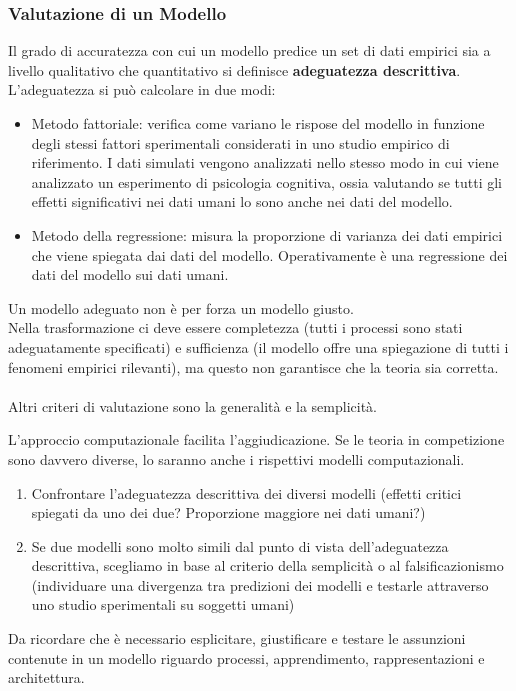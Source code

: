 \documentclass[12pt, a4paper]{article}
\begin{document}
\subsubsection{Valutazione di un Modello}
Il grado di accuratezza con cui un modello predice un set di dati empirici sia a livello qualitativo che quantitativo si definisce \textbf{adeguatezza descrittiva}.
L'adeguatezza si può calcolare in due modi:
\begin{itemize}
    \item Metodo fattoriale: verifica come variano le rispose del modello in funzione degli stessi fattori sperimentali considerati in uno studio empirico di riferimento. I dati simulati vengono analizzati nello stesso modo in cui viene analizzato un esperimento di psicologia cognitiva, ossia valutando se tutti gli effetti significativi nei dati umani lo sono anche nei dati del modello.
    \item Metodo della regressione: misura la proporzione di varianza dei dati empirici che viene spiegata dai dati del modello. Operativamente è una regressione dei dati del modello sui dati umani.
\end{itemize}
Un modello adeguato non è per forza un modello giusto.\\
Nella trasformazione ci deve essere completezza (tutti i processi sono stati adeguatamente specificati) e sufficienza (il modello offre una spiegazione di tutti i fenomeni empirici rilevanti), ma questo non garantisce che la teoria sia corretta.\\\\
Altri criteri di valutazione sono la generalità e la semplicità.

L'approccio computazionale facilita l'aggiudicazione. Se le teoria in competizione sono davvero diverse, lo saranno anche i rispettivi modelli computazionali.
\begin{enumerate}
    \item Confrontare l'adeguatezza descrittiva dei diversi modelli (effetti critici spiegati da uno dei due? Proporzione maggiore nei dati umani?)
    \item Se due modelli sono molto simili dal punto di vista dell'adeguatezza descrittiva, scegliamo in base al criterio della semplicità o al falsificazionismo (individuare una divergenza tra predizioni dei modelli e testarle attraverso uno studio sperimentali su soggetti umani)
\end{enumerate}

Da ricordare che è necessario esplicitare, giustificare e testare le assunzioni contenute in un modello riguardo processi, apprendimento, rappresentazioni e architettura.
\end{document}
